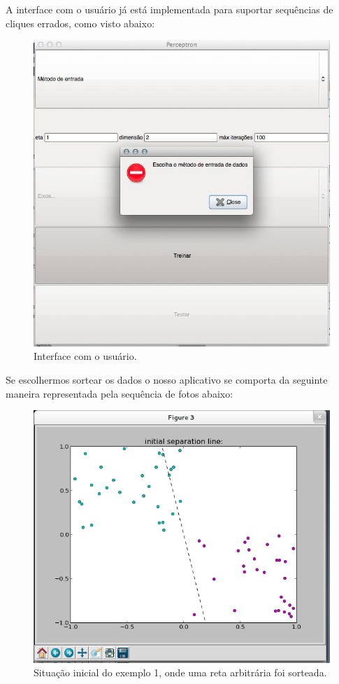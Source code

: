 \documentclass[brazil, a4paper]{article}
\begin{document}
\begin{description}
A interface com o usuário já está implementada para suportar sequências de
cliques errados, como visto abaixo:


\begin{figure}[!htb]
\centering
\includegraphics[scale=0.35]{erro.jpg}
\caption{Interface com o usuário.}
\end{figure}

Se escolhermos sortear os dados o nosso aplicativo se comporta da seguinte
maneira representada pela sequência de fotos abaixo:

\begin{figure}[!htb]
\centering
\includegraphics[scale=0.32]{ex1-1.png}
\caption{Situação inicial do exemplo 1, onde uma reta arbitrária foi sorteada.}
\end{figure}


\end{description}
\end{document}
